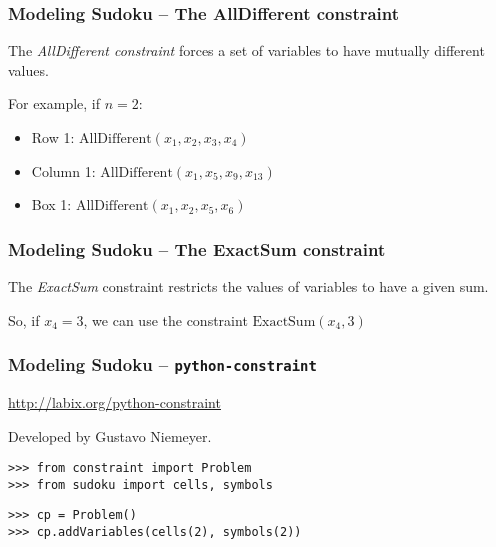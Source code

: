 \documentclass{beamer}
\begin{document}
\begin{frame}[fragile]
\frametitle{Modeling Sudoku -- The AllDifferent constraint}
The \emph{AllDifferent constraint} forces a set of variables to have mutually different values.\pause

\pause

For example, if $n = 2$: \pause
  \begin{itemize}
   \item Row 1: $\mbox{AllDifferent}(x_{1}, x_{2}, x_{3}, x_{4})$ \pause
   \item Column 1: $\mbox{AllDifferent}(x_{1}, x_{5}, x_{9}, x_{13})$ \pause
   \item Box 1: $\mbox{AllDifferent}(x_{1}, x_{2}, x_{5}, x_{6})$ 
  \end{itemize}
\end{frame}

\begin{frame}[fragile]
\frametitle{Modeling Sudoku -- The ExactSum constraint}

The \emph{ExactSum} constraint restricts the values of variables to have a given sum.

So, if $x_4 = 3$, we can use the constraint $\mbox{ExactSum}(x_4, 3)$

\end{frame}


\begin{frame}[fragile]
\frametitle{Modeling Sudoku -- \texttt{python-constraint}}

\url{http://labix.org/python-constraint}

Developed by Gustavo Niemeyer.

\pause

\begin{lstlisting}
>>> from constraint import Problem
>>> from sudoku import cells, symbols
\end{lstlisting}
\pause
\begin{lstlisting}
>>> cp = Problem()
>>> cp.addVariables(cells(2), symbols(2))
\end{lstlisting}

\end{frame}
\end{document}
